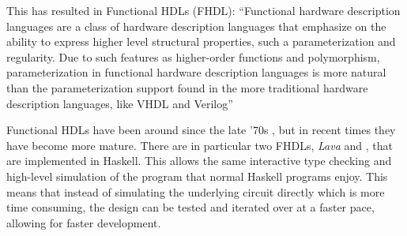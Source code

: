 		This has resulted in Functional HDLs (FHDL): ``Functional hardware
		description languages are a class of hardware description languages
		that emphasize on the ability to express higher level structural
		properties, such a parameterization and regularity. Due to such
		features as higher-order functions and polymorphism, parameterization
		in functional hardware description languages is more natural than the
		parameterization support found in the more traditional hardware
		description languages, like VHDL and Verilog'' \cite{Baaij2009}
		
		Functional HDLs have been around since the late '70s \cite{Chen2012},
		but in recent times they have become more mature. There are in
		particular two FHDLs, \emph{Lava} and \clash \cite{Baaij2009,
		Bjesse1998}, that are implemented in Haskell.  This allows the same
		interactive type checking and high-level simulation of the program that
		normal Haskell programs enjoy. This means that instead of simulating
		the underlying circuit directly which is more time consuming, the
		design can be tested and iterated over at a faster pace,
		allowing for faster development.
